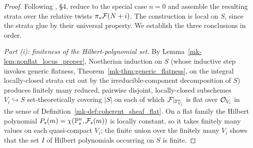 \begin{proof}
  Following \cite{nitsure-hilbert-quot}, \S4, reduce to the special case \(n = 0\) and assemble
  the resulting strata over the relative twists \(\pi_* \mathcal{F}(N+i)\).  The
  construction is local on \(S\), since the strata glue by their universal
  property.  We establish the three conclusions in order.

  \emph{Part (i): finiteness of the Hilbert-polynomial set.}
  By Lemma~\ref{mk-lem:nonflat_locus_proper}, Noetherian induction on \(S\) (whose
  inductive step invokes generic flatness, Theorem~\ref{mk-thm:generic_flatness},
  on the integral locally-closed strata cut out by the irreducible-component
  decomposition of \(S\)) produces finitely many reduced, pairwise disjoint,
  locally-closed subschemes \(V_i \hookrightarrow S\) set-theoretically covering
  \(|S|\) on each of which \(\mathcal{F}|_{\mathbb{P}^n_{V_i}}\) is flat over \(\mathcal{O}_{V_i}\) in
  the sense of Definition~\ref{mk-def:coherent_sheaf_flat}.  On a flat family the
  Hilbert polynomial \(P_s(m) = \chi(\mathbb{P}^n_s, \mathcal{F}_s(m))\) is locally constant, so
  it takes finitely many values on each quasi-compact \(V_i\); the finite union
  over the finitely many \(V_i\) shows that the set \(I\) of Hilbert polynomials
  occurring on \(S\) is finite.


\end{proof}
